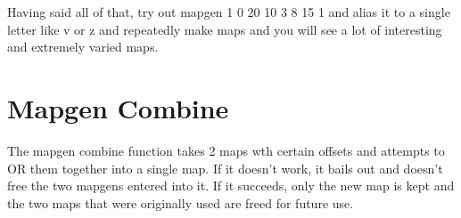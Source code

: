 Having said all of that, try out mapgen 1 0 20 10 3 8 15 1 and alias it to a
single letter like v or z and repeatedly make maps and you will see a lot of
interesting and extremely varied maps.


\section{Mapgen Combine}

The mapgen combine function takes 2 maps wth certain offsets and attempts
to OR them together into a single map. If it doesn't work, it bails out and
doesn't free the two mapgens entered into it. If it succeeds, only the
new map is kept and the two maps that were originally used are freed
for future use.



